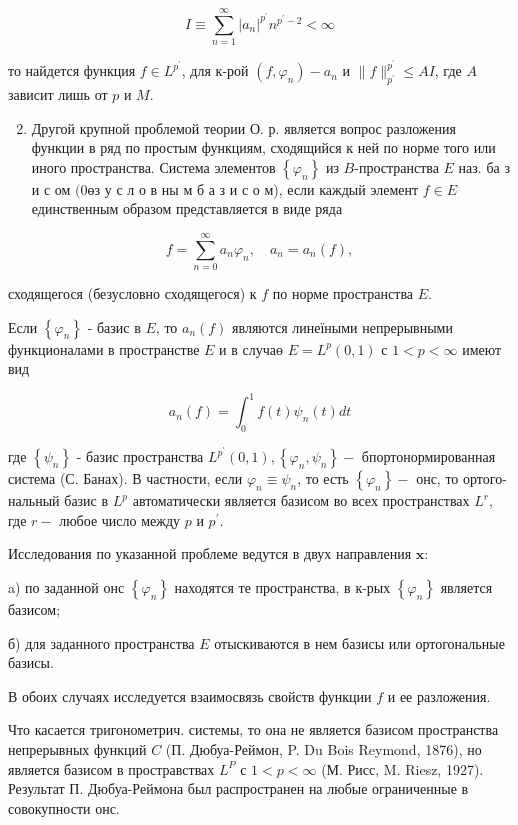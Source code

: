 \documentclass[10pt]{article}
\begin{document}
\[
I \equiv \sum_{n=1}^{\infty}\left|a_{n}\right|^{p^{\prime}} n^{p^{\prime}-2}<\infty
\]

то найдется функция $f \in L^{p^{\prime}}$, для к-рой $\left(f, \varphi_{n}\right)-a_{n}$ и $\|f\|_{p^{\prime}}^{p^{\prime}} \leqslant A I$, где $A$ зависит лишь от $p$ и $M$.

\begin{enumerate}
  \setcounter{enumi}{1}
  \item Другой крупной проблемой теории О. р. является вопрос разложения функции в ряд по простым функциям, сходящийся к ней по норме того или иного пространства. Система элементов $\left\{\varphi_{n}\right\}$ из $B$-пространства $E$ наз. ба з и с ом $(0 ө з$ у с л о в ны м б а з и с о м), если каждый элемент $f \in E$ единственным образом представляется в виде ряда
\end{enumerate}

\[
f=\sum_{n=0}^{\infty} a_{n} \varphi_{n}, \quad a_{n}=a_{n}(f),
\]

сходящегося (безусловно сходящегося) к $f$ по норме пространства $E$.

Если $\left\{\varphi_{n}\right\}$ - базис в $E$, то $a_{n}(f)$ являются линеїными непрерывными функционалами в пространстве $E$ и в случаө $E=L^{p}(0,1)$ с $1<p<\infty$ имеют вид

\[
a_{n}(f)=\int_{0}^{1} f(t) \psi_{n}(t) d t
\]

где $\left\{\psi_{n}\right\}$ - базис пространства $L^{p^{\prime}}(0,1),\left\{\varphi_{n}, \psi_{n}\right\}-$ бпортонормированная система (С. Банах). В частности, если $\varphi_{n} \equiv \psi_{n}$, то есть $\left\{\varphi_{n}\right\}-$ онс, то ортого- нальный базис в $L^{p}$ автоматически является базисом во всех пространствах $L^{r}$, где $r-$ любое число между $p$ и $p^{\prime}$.

Исследования по указанной проблеме ведутся в двух направления $\mathbf{x}:$

a) по заданной онс $\left\{\varphi_{n}\right\}$ находятся те пространства, в к-рых $\left\{\varphi_{n}\right\}$ является базисом;

б) для заданного пространства $E$ отыскиваются в нем базисы или ортогональные базисы.

В обоих случаях исследуется взаимосвязь свойств функции $f$ и ее разложения.

Что касается тригонометрич. системы, то она не является базисом пространства непрерывных функций $C$ (П. Дюбуа-Реймон, P. Du Bois Reymond, 1876), но является базисом в простравствах $L^{P}$ с $1<p<\infty$ (М. Рисс, M. Riesz, 1927). Результат П. Дюбуа-Реймона был распространен на любые ограниченные в совокупности онс.
\end{document}
